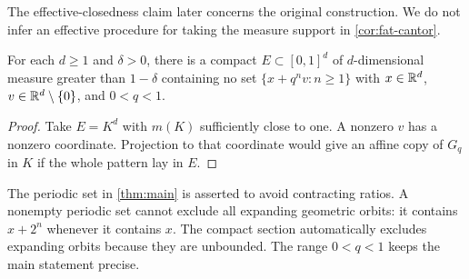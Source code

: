 The effective-closedness claim later concerns the original construction.
We do not infer an effective procedure for taking the measure support
in \cref{cor:fat-cantor}.

\begin{corollary}\label{cor:dimensions}
For each $d\ge1$ and $\delta>0$, there is a compact
$E\subset[0,1]^d$ of $d$-dimensional measure greater than $1-\delta$
containing no set $\{x+q^nv:n\ge1\}$ with $x\in\mathbb R^d$,
$v\in\mathbb R^d\setminus\{0\}$, and $0<q<1$.
\end{corollary}

\begin{proof}
Take $E=K^d$ with $m(K)$ sufficiently close to one. A nonzero $v$
has a nonzero coordinate. Projection to that coordinate would give
an affine copy of $G_q$ in $K$ if the whole pattern lay in $E$.
\end{proof}

The periodic set in \cref{thm:main} is asserted to avoid contracting
ratios. A nonempty periodic set cannot exclude all expanding geometric
orbits: it contains $x+2^n$ whenever it contains $x$. The compact
section automatically excludes expanding orbits because they are
unbounded. The range $0<q<1$ keeps the main statement precise.
